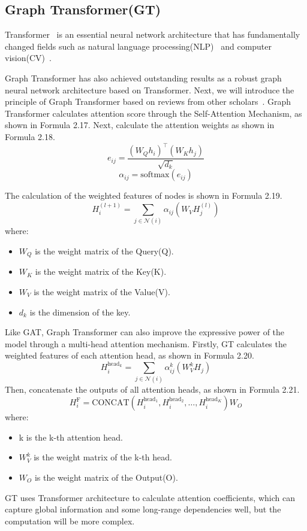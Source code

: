 \documentclass[ %
                    author={Tengyao Tu},
                supervisor={Dr. James Pope},
                    degree={MSc},
                     title={A New Perspective on Graph Community Detection: Combining Traditional Methods with Deep Learning Approaches},
                  subtitle={Applying to Telecom Networks and Diverse Datasets},
                      type={},
                      year={2024}]{dissertation}
\begin{document}
\subsection{Graph Transformer(GT)}
Transformer~\cite{vaswani2017attention} is an essential neural network architecture that has fundamentally changed fields such as natural language processing(NLP)~\cite{devlin2018bert} and computer vision(CV)~\cite{kim2021vilt}.

Graph Transformer has also achieved outstanding results as a robust graph neural network architecture based on Transformer. Next, we will introduce the principle of Graph Transformer based on reviews from other scholars~\cite{min2022transformer}. Graph Transformer calculates attention score through the Self-Attention Mechanism, as shown in Formula 2.17. Next, calculate the attention weights as shown in Formula 2.18.
\begin{equation}
e_{ij} = \frac{(W_Q h_i)^\top (W_K h_j)}{\sqrt{d_k}}
\label{eq: Transformer1}
\end{equation}
\begin{equation}
\alpha_{ij} = \text{softmax}(e_{ij})
\label{eq: Transformer2}
\end{equation}

The calculation of the weighted features of nodes is shown in Formula 2.19.
\begin{equation}
H_i^{(l+1)}= \sum_{j \in \mathcal{N}(i)} \alpha_{ij} (W_V H_j^{(l)})
\label{eq: Transformer3}
\end{equation}
where:
\begin{itemize}
    \item $W_Q$ is the weight matrix of the Query(Q).
    \item $W_K$ is the weight matrix of the Key(K).
    \item $W_V$ is the weight matrix of the Value(V).
    \item $d_k$ is the dimension of the key.
\end{itemize}
Like GAT, Graph Transformer can also improve the expressive power of the model through a multi-head attention mechanism. Firstly, GT calculates the weighted features of each attention head, as shown in Formula 2.20.
\begin{equation}
H_i^{\text{head}_k} = \sum_{j \in \mathcal{N}(i)} \alpha_{ij}^k (W_V^k H_j)
\label{eq: Transformer4}
\end{equation}
Then, concatenate the outputs of all attention heads, as shown in Formula 2.21.
\begin{equation}
H_i^{\text{F}} = \text{CONCAT}(H_i^{\text{head}_1}, H_i^{\text{head}_2}, \ldots, H_i^{\text{head}_K}) W_O
\label{eq: Transformer5}
\end{equation}
where:
\begin{itemize}
    \item k is the k-th attention head.
    \item $W_V^k$ is the weight matrix of the k-th head.
    \item $W_O$ is the weight matrix of the Output(O).
\end{itemize}
GT uses Transformer architecture to calculate attention coefficients, which can capture global information and some long-range dependencies well, but the computation will be more complex.
\end{document}
